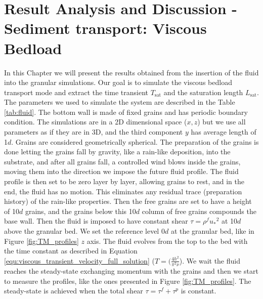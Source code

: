 
\chapter{Result Analysis and Discussion - Sediment transport: Viscous Bedload}
\label{chap:Resultados-CFD}

    In this Chapter we will present the results obtained from the insertion of the fluid into the granular simulations. Our goal is to simulate the viscous bedload transport mode and extract the time transient $T_\textrm{sat}$ and the saturation length $L_\textrm{sat}$. The parameters we used to simulate the system are described in the Table \ref{tab:fluid}. The bottom wall is made of fixed grains and has periodic boundary condition. The simulations are in a 2D dimensional space ($x,z$) but we use all parameters as if they are in 3D, and the third component $y$ has average length of 1$d$. Grains are considered geometrically spherical. The preparation of the grains is done letting the grains fall by gravity, like a rain-like deposition, into the substrate, and after all grains fall, a controlled wind blows inside the grains, moving them into the direction we impose the future fluid profile. The fluid profile is then set to be zero layer by layer, allowing grains to rest, and in the end, the fluid has no motion. This eliminates any residual trace (preparation history) of the rain-like properties. Then the free grains are set to have a height of 10$d$ grains, and the grains below this 10$d$ column of free grains compounds the base wall. Then the fluid is imposed to have constant shear $\tau = \rho^f {u_{*}}^2$ at 10$d$ above the granular bed. We set the reference level 0$d$ at the granular bed, like in Figure \ref{fig:TM_profiles} $z$ axis. The fluid evolves from the top to the bed with the time constant as described in Equation \ref{equ:viscous_transient_velocity_full_solution} ($T = (\frac{4h^2}{\pi^2 \nu}$). We wait the fluid reaches the steady-state exchanging momentum with the grains and then we start to measure the profiles, like the ones presented in Figure \ref{fig:TM_profiles}. The steady-state is achieved when the total shear $\tau=\tau^f+\tau^p$ is constant.



